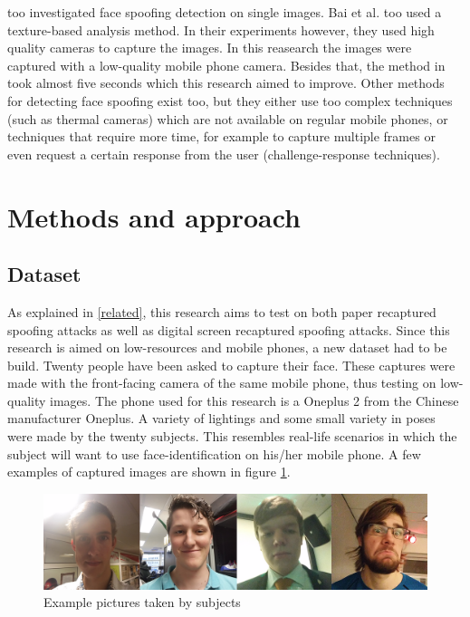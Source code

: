 \documentclass{sig-alternate-br}
\begin{document}
\cite{bai2010physics} too investigated face spoofing detection on single images. Bai et al. too used a texture-based analysis method. In their experiments however, they used high quality cameras to capture the images. In this reasearch the images were captured with a low-quality mobile phone camera. Besides that, the method in \cite{bai2010physics} took almost five seconds which this research aimed to improve.
Other methods for detecting face spoofing exist too, but they either use too complex techniques (such as thermal cameras) which are not available on regular mobile phones, or techniques that require more time, for example to capture multiple frames or even request a certain response from the user (challenge-response techniques).

\section{Methods and approach} \label{methods}

\subsection{Dataset} \label{dataset}
As explained in \ref{related}, this research aims to test on both paper recaptured spoofing attacks as well as digital screen recaptured spoofing attacks. Since this research is aimed on low-resources and mobile phones, a new dataset had to be build. Twenty people have been asked to capture their face. These captures were made with the front-facing camera of the same mobile phone, thus testing on low-quality images. The phone used for this research is a Oneplus 2 from the Chinese manufacturer Oneplus. A variety of lightings and some small variety in poses were made by the twenty subjects. This resembles real-life scenarios in which the subject will want to use face-identification on his/her mobile phone. A few examples of captured images are shown in figure \ref{fig:pictures}.

\begin{figure}[h]
	\includegraphics[scale=0.2]{pictures}
	\caption{Example pictures taken by subjects}
	\label{fig:pictures}
\end{figure}
\end{document}

